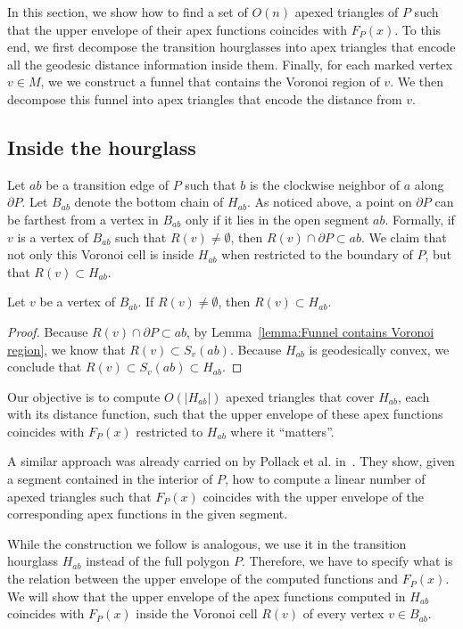 \documentclass[a4paper,UKenglish]{lipics}
\newcommand{\F}[2]{\ensuremath{F_{\scriptscriptstyle #1}(#2)}}
\newcommand{\fn}[2]{\ensuremath{S_{\scriptscriptstyle #1}(#2)}}
\begin{document}
In this section, we show how to find a set of $O(n)$ apexed triangles of $P$ such that the upper envelope of their apex functions coincides with $\F{P}{x}$.
To this end, we first decompose the transition hourglasses into apex triangles that encode all the geodesic distance information inside them. Finally, for each marked vertex $v\in M$, we we construct a funnel that contains the Voronoi region of $v$.  We then decompose this funnel into apex triangles that encode the distance from $v$.

\subsection{Inside the hourglass}
Let $ab$ be a transition edge of $P$  such that $b$ is the clockwise neighbor of $a$ along $\partial P$.
Let $B_{ab}$ denote the bottom chain of $H_{ab}$.
As noticed above, a point on $\partial P$ can be farthest from a vertex in $B_{ab}$ only if it lies in the open segment $ab$.
Formally, if $v$ is a vertex of $B_{ab}$ such that $R(v)\neq \emptyset$, then $R(v)\cap \partial P \subset ab$.
We claim that not only this Voronoi cell is inside $H_{ab}$ when restricted to the boundary of $P$, but that $R(v)\subset H_{ab}$. 

\begin{lemma}\label{lemma:Cell contained in geodesic triangle}
Let $v$ be a vertex of $B_{ab}$. If $R(v)\neq \emptyset$, then $R(v) \subset H_{ab}$.
\end{lemma}
\begin{proof}
Because $R(v)\cap \partial P \subset ab$, by Lemma~\ref{lemma:Funnel contains Voronoi region}, we know that $R(v)\subset \fn{v}{ab}$. Because $H_{ab}$ is geodesically convex, we conclude that $R(v)\subset \fn{v}{ab}\subset H_{ab}$.
\end{proof}


Our objective is to compute $O(|H_{ab}|)$ apexed triangles that cover $H_{ab}$, each with its distance function, such that the upper envelope of these apex functions coincides with $\F{P}{x}$ restricted to $H_{ab}$ where it ``matters''.

A similar approach was already carried on by Pollack et al. in~\cite[Section 3]{pollackComputingCenter}. 
They show, given a segment contained in the interior of $P$, 
how to compute a linear number of apexed triangles such that $\F{P}{x}$ coincides with the upper envelope of the corresponding apex functions in the given segment.

While the construction we follow is analogous, we use it in the transition hourglass $H_{ab}$ instead of the full polygon $P$. 
Therefore, we have to specify what is the relation between the upper envelope of the computed functions and $\F{P}{x}$. 
We will show that the upper envelope of the apex functions computed in $H_{ab}$ coincides with $\F{P}{x}$ inside the Voronoi cell $R(v)$ of every vertex $v\in B_{ab}$.
\end{document}
